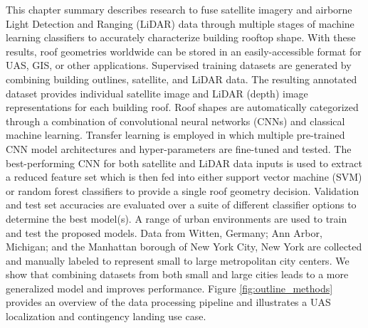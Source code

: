 

This chapter summary describes research to fuse satellite imagery and airborne Light Detection and Ranging (LiDAR) data through multiple stages of machine learning classifiers to accurately characterize building rooftop shape.  With these results, roof geometries worldwide can be stored in an easily-accessible format for UAS, GIS, or other applications. Supervised training datasets are generated by combining building outlines, satellite, and LiDAR data. The resulting annotated dataset provides individual satellite image and LiDAR (depth) image representations for each building roof. Roof shapes are automatically categorized through a combination of convolutional neural networks (CNNs) and classical machine learning. Transfer learning is employed in which multiple pre-trained CNN model architectures and hyper-parameters are fine-tuned and tested. The best-performing CNN for both satellite and LiDAR data inputs is used to extract a reduced feature set which is then fed into either support vector machine (SVM) or random forest classifiers to provide a single roof geometry decision.  Validation and test set accuracies are evaluated over a suite of different classifier options to determine the best model(s). A range of urban environments are used to train and test the proposed models. Data from Witten, Germany; Ann Arbor, Michigan; and the Manhattan borough of New York City, New York are collected and manually labeled to represent small to large metropolitan city centers. We show that combining datasets from both small and large cities leads to a more generalized model and improves performance. Figure \ref{fig:outline_methods} provides an overview of the data processing pipeline and illustrates a {UAS localization and contingency landing} use case. %


